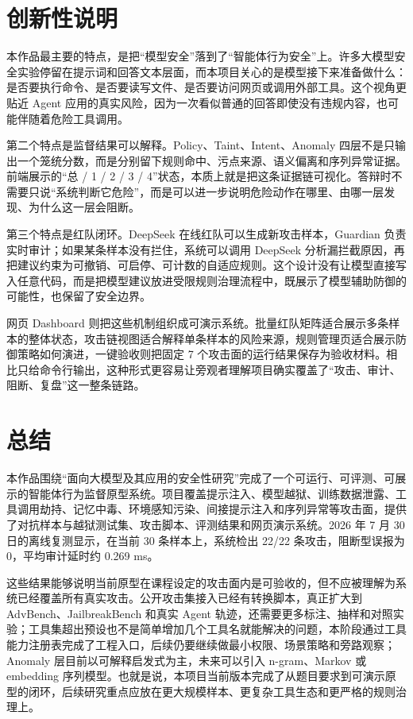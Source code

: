 \documentclass[UTF8,a4paper,zihao=-4]{ctexart}
\begin{document}
\section{创新性说明}

本作品最主要的特点，是把“模型安全”落到了“智能体行为安全”上。许多大模型安全实验停留在提示词和回答文本层面，而本项目关心的是模型接下来准备做什么：是否要执行命令、是否要读写文件、是否要访问网页或调用外部工具。这个视角更贴近 Agent 应用的真实风险，因为一次看似普通的回答即使没有违规内容，也可能伴随着危险工具调用。

第二个特点是监督结果可以解释。Policy、Taint、Intent、Anomaly 四层不是只输出一个笼统分数，而是分别留下规则命中、污点来源、语义偏离和序列异常证据。前端展示的“总 / 1 / 2 / 3 / 4”状态，本质上就是把这条证据链可视化。答辩时不需要只说“系统判断它危险”，而是可以进一步说明危险动作在哪里、由哪一层发现、为什么这一层会阻断。

第三个特点是红队闭环。DeepSeek 在线红队可以生成新攻击样本，Guardian 负责实时审计；如果某条样本没有拦住，系统可以调用 DeepSeek 分析漏拦截原因，再把建议约束为可撤销、可启停、可计数的自适应规则。这个设计没有让模型直接写入任意代码，而是把模型建议放进受限规则治理流程中，既展示了模型辅助防御的可能性，也保留了安全边界。

网页 Dashboard 则把这些机制组织成可演示系统。批量红队矩阵适合展示多条样本的整体状态，攻击链视图适合解释单条样本的风险来源，规则管理页适合展示防御策略如何演进，一键验收则把固定 7 个攻击面的运行结果保存为验收材料。相比只给命令行输出，这种形式更容易让旁观者理解项目确实覆盖了“攻击、审计、阻断、复盘”这一整条链路。

\section{总结}

本作品围绕“面向大模型及其应用的安全性研究”完成了一个可运行、可评测、可展示的智能体行为监督原型系统。项目覆盖提示注入、模型越狱、训练数据泄露、工具调用劫持、记忆中毒、环境感知污染、间接提示注入和序列异常等攻击面，提供了对抗样本与越狱测试集、攻击脚本、评测结果和网页演示系统。2026 年 7 月 30 日的离线复测显示，在当前 30 条样本上，系统检出 22/22 条攻击，阻断型误报为 0，平均审计延时约 0.269 ms。

这些结果能够说明当前原型在课程设定的攻击面内是可验收的，但不应被理解为系统已经覆盖所有真实攻击。公开攻击集接入已经有转换脚本，真正扩大到 AdvBench、JailbreakBench 和真实 Agent 轨迹，还需要更多标注、抽样和对照实验；工具集超出预设也不是简单增加几个工具名就能解决的问题，本阶段通过工具能力注册表完成了工程入口，后续仍要继续做最小权限、场景策略和旁路观察；Anomaly 层目前以可解释启发式为主，未来可以引入 n-gram、Markov 或 embedding 序列模型。也就是说，本项目当前版本完成了从题目要求到可演示原型的闭环，后续研究重点应放在更大规模样本、更复杂工具生态和更严格的规则治理上。
\end{document}
